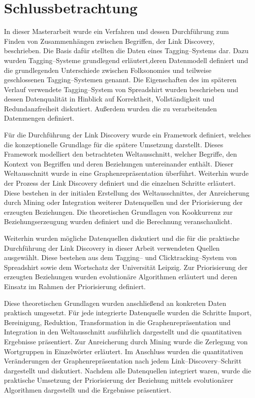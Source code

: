 \chapter{Schlussbetrachtung}
\label{summary}

In dieser Masterarbeit wurde ein Verfahren und dessen Durchführung zum Finden von Zusammenhängen zwischen Begriffen, der Link Discovery, beschrieben. Die Basis dafür stellten die Daten eines Tagging--Systems dar. Dazu wurden Tagging--Systeme grundlegend erläutert,deren Datenmodell definiert und die grundlegenden Unterschiede zwischen Folksonomies und teilweise geschlossenen Tagging--Systemen genannt. Die Eigenschaften des im späteren Verlauf verwendete Tagging--System von Spreadshirt wurden beschrieben und dessen Datenqualität in Hinblick auf Korrektheit, Vollständigkeit und Redundanzfreiheit diskutiert. Außerdem wurden die zu verarbeitenden Datenmengen definiert.

Für die Durchführung der Link Discovery wurde ein Framework definiert, welches die konzeptionelle Grundlage für die spätere Umsetzung darstellt. Dieses Framework modelliert den betrachteten Weltausschnitt, welcher Begriffe, den Kontext von Begriffen und deren Beziehungen untereinander enthält. Dieser Weltausschnitt wurde in eine Graphenrepräsentation überführt. Weiterhin wurde der Prozess der Link Discovery definiert und die einzelnen Schritte erläutert. Diese bestehen in der initialen Erstellung des Weltausschnittes, der Anreicherung durch Mining oder Integration weiterer Datenquellen und der Priorisierung der erzeugten Beziehungen. Die theoretischen Grundlagen von Kookkurrenz zur Beziehungserzeugung wurden definiert und die Berechnung veranschaulicht.

Weiterhin wurden mögliche Datenquellen diskutiert und die für die praktische Durchführung der Link Discovery in dieser Arbeit verwendeten Quellen ausgewählt. Diese bestehen aus dem Tagging-- und Clicktracking--System von Spreadshirt sowie dem Wortschatz der Universität Leipzig. Zur Priorisierung der erzeugten Beziehungen wurden evolutionäre Algorithmen erläutert und deren Einsatz im Rahmen der Priorisierung definiert.

Diese theoretischen Grundlagen wurden anschließend an konkreten Daten praktisch umgesetzt. Für jede integrierte Datenquelle wurden die Schritte Import, Bereinigung, Reduktion, Transformation in die Graphenrepräsentation und Integration in den Weltausschnitt ausführlich dargestellt und die quantitativen Ergebnisse präsentiert. Zur Anreicherung durch Mining wurde die Zerlegung von Wortgruppen in Einzelwörter erläutert. Im Anschluss wurden die quantitativen Veränderungen der Graphenrepräsentation nach jedem Link--Discovery--Schritt dargestellt und diskutiert. Nachdem alle Datenquellen integriert waren, wurde die praktische Umsetzung der Priorisierung der Beziehung mittels evolutionärer Algorithmen dargestellt und die Ergebnisse präsentiert.


